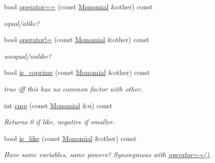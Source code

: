 \begin{Indent}
\begin{DoxyCompactItemize}
bool \hyperlink{group__polygroup_a063e7166a4bf8abc8748f8758cc31d73}{operator==} (const \hyperlink{group__polygroup_class_monomial}{Monomial} \&other) const
\begin{DoxyCompactList}\small\item\em equal/alike? \end{DoxyCompactList}\item 
\mbox{\label{group__polygroup_a0fb6394c2de8d206d119783707618db7}} 
bool \hyperlink{group__polygroup_a0fb6394c2de8d206d119783707618db7}{operator!=} (const \hyperlink{group__polygroup_class_monomial}{Monomial} \&other) const
\begin{DoxyCompactList}\small\item\em unequal/unlike? \end{DoxyCompactList}\item 
\mbox{\label{group__polygroup_afa3c3085358be86a5f593d7259f80000}} 
bool \hyperlink{group__polygroup_afa3c3085358be86a5f593d7259f80000}{is\+\_\+coprime} (const \hyperlink{group__polygroup_class_monomial}{Monomial} \&other) const
\begin{DoxyCompactList}\small\item\em {\ttfamily true} iff {\ttfamily this} has no common factor with {\ttfamily other}. \end{DoxyCompactList}\item 
\mbox{\label{group__polygroup_adf3fd71374a0058b653edd441b8dfb5d}} 
int \hyperlink{group__polygroup_adf3fd71374a0058b653edd441b8dfb5d}{cmp} (const \hyperlink{group__polygroup_class_monomial}{Monomial} \&u) const
\begin{DoxyCompactList}\small\item\em Returns 0 if like, negative if smaller. \end{DoxyCompactList}\item 
\mbox{\label{group__polygroup_a563c96b359a1faa97d73be48576c1d42}} 
bool \hyperlink{group__polygroup_a563c96b359a1faa97d73be48576c1d42}{is\+\_\+like} (const \hyperlink{group__polygroup_class_monomial}{Monomial} \&other) const
\begin{DoxyCompactList}\small\item\em Have same variables, same powers? Synonymous with \hyperlink{group__polygroup_a063e7166a4bf8abc8748f8758cc31d73}{operator==()}. \end{DoxyCompactList}\item 

\end{DoxyCompactItemize}
\end{Indent}
